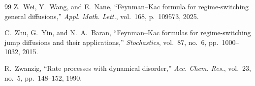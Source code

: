 \documentclass[11pt]{amsart}
\theoremstyle{plain}
\theoremstyle{definition}
\theoremstyle{remark}
\begin{document}
\begin{thebibliography}{99}
		Z.~Wei, Y.~Wang, and E.~Nane, ``Feynman–Kac formula for regime-switching general diffusions,'' \textit{Appl. Math. Lett.}, vol.~168, p.~109573, 2025.
		
		C.~Zhu, G.~Yin, and N.~A.~Baran, ``Feynman–Kac formulas for regime-switching jump diffusions and their applications,'' \textit{Stochastics}, vol.~87, no.~6, pp.~1000--1032, 2015.
		
		R.~Zwanzig, ``Rate processes with dynamical disorder,'' \textit{Acc. Chem. Res.}, vol.~23, no.~5, pp.~148--152, 1990.
		
	\end{thebibliography}
	
\end{document}
